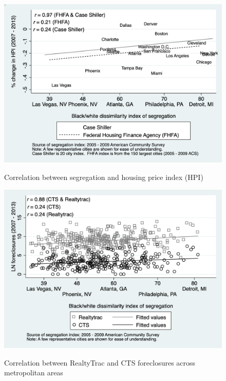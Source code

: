 \documentclass[12pt]{article}
\begin{document}
\begin{figure}[htp!]
\centering
\caption{Correlation between segregation and housing price index (HPI)}
\centering
\includegraphics[scale=.75]{../graphs/segregation_hpi}
\label{segregation_hpi}
\end{figure}

\begin{figure}[htp!]
\centering
\caption{Correlation between RealtyTrac and CTS foreclosures across metropolitan
areas}
\centering
\includegraphics[scale=.75]{../graphs/cor_cts_realtytrac}
\label{cor_cts_realtytrac}
\end{figure}
\end{document}
